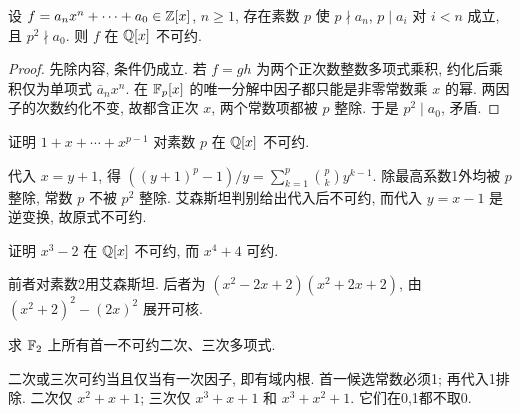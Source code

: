\begin{theorem}[艾森斯坦]\label{thm:eisenstein}
设 $f=a_nx^n+\cdots+a_0\in\mathbb Z[x]$, $n\ge1$, 存在素数 $p$ 使 $p\nmid a_n$, $p\mid a_i$ 对 $i<n$ 成立, 且 $p^2\nmid a_0$. 则 $f$ 在 $\mathbb Q[x]$ 不可约.
\end{theorem}
\begin{proof}
先除内容, 条件仍成立. 若 $f=gh$ 为两个正次数整数多项式乘积, 约化后乘积仅为单项式 $\bar a_nx^n$. 在 $\mathbb F_p[x]$ 的唯一分解中因子都只能是非零常数乘 $x$ 的幂. 两因子的次数约化不变, 故都含正次 $x$, 两个常数项都被 $p$ 整除. 于是 $p^2\mid a_0$, 矛盾.
\end{proof}
\begin{example}证明 $1+x+\cdots+x^{p-1}$ 对素数 $p$ 在 $\mathbb Q[x]$ 不可约.\end{example}
\begin{solution}
代入 $x=y+1$, 得 $((y+1)^p-1)/y=\sum_{k=1}^p\binom pk y^{k-1}$. 除最高系数1外均被 $p$ 整除, 常数 $p$ 不被 $p^2$ 整除. 艾森斯坦判别给出代入后不可约, 而代入 $y=x-1$ 是逆变换, 故原式不可约.
\end{solution}
\begin{exercise}证明 $x^3-2$ 在 $\mathbb Q[x]$ 不可约, 而 $x^4+4$ 可约.\end{exercise}
\begin{solution}
前者对素数2用艾森斯坦. 后者为 $(x^2-2x+2)(x^2+2x+2)$, 由 $(x^2+2)^2-(2x)^2$ 展开可核.
\end{solution}
\begin{exercise}求 $\mathbb F_2$ 上所有首一不可约二次、三次多项式.\end{exercise}
\begin{solution}
二次或三次可约当且仅当有一次因子, 即有域内根. 首一候选常数必须1; 再代入1排除. 二次仅 $x^2+x+1$; 三次仅 $x^3+x+1$ 和 $x^3+x^2+1$. 它们在0,1都不取0.
\end{solution}
